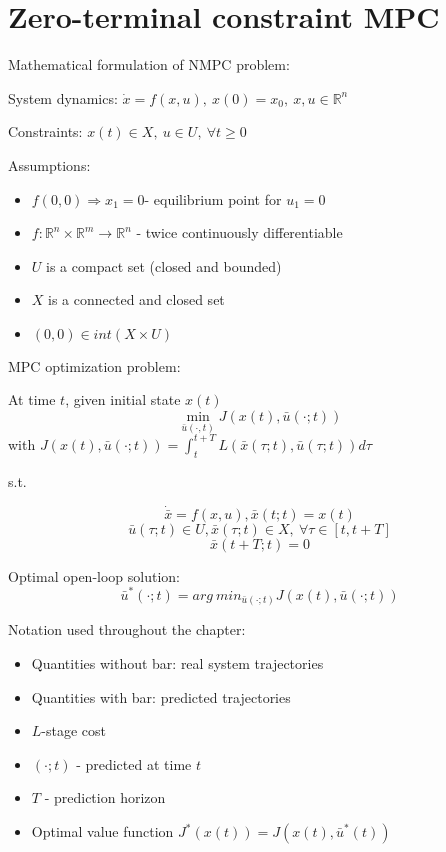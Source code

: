 \section{Zero-terminal constraint MPC}

Mathematical formulation of NMPC problem:

System dynamics: $\dot x = f(x,u), \ x(0) = x_0, \ x,u \in \mathbb{R}^n$

Constraints: $x(t) \in X, \ u \in U, \ \forall t \geq 0$

Assumptions:
\begin{itemize}
\item $f(0,0) \Rightarrow x_1=0 $- equilibrium point for $u_1 = 0$
\item $f: \mathbb{R}^n \times \mathbb{R}^m \to \mathbb{R}^n$ - twice continuously differentiable
\item $U$ is a compact set (closed and bounded)
\item $X$ is a connected and closed set
\item $(0,0) \in int(X \times U)$ 
\end{itemize}

MPC optimization problem:

At time $t$, given initial state $x(t)$
\begin{equation*}
\min_{\bar u(\cdot,t)} J(x(t),\bar u(\cdot ;t))
\end{equation*}
with $J(x(t),\bar u(\cdot;t)) = \int_{t}^{t+T}L(\bar x(\tau;t),\bar u(\tau;t))d\tau$

s.t.

\begin{equation*}
\dot{\bar x} = f(x,u), \bar x(t;t) = x(t)
\end{equation*}
\begin{equation*}
\bar u(\tau;t) \in U, \bar x(\tau;t) \in X, \  \forall \tau \in [t, t +T] 
\end{equation*}
\begin{equation*}
\bar x(t+T;t) = 0
\end{equation*}

Optimal open-loop solution: 
\begin{equation*}
\bar u^* (\cdot;t) = arg\ min_{\bar u(\cdot;t)} J(x(t), \bar u(\cdot; t))
\end{equation*}

Notation used throughout the chapter:
\begin{itemize}
\item Quantities without bar: real system trajectories
\item Quantities with bar: predicted trajectories
\item $L$-stage cost
\item $(\cdot;t)$ - predicted at time $t$
\item $T$ - prediction horizon
\item Optimal value function $J^*(x(t)) = J(x(t), \bar u^*(t))$
\end{itemize}

